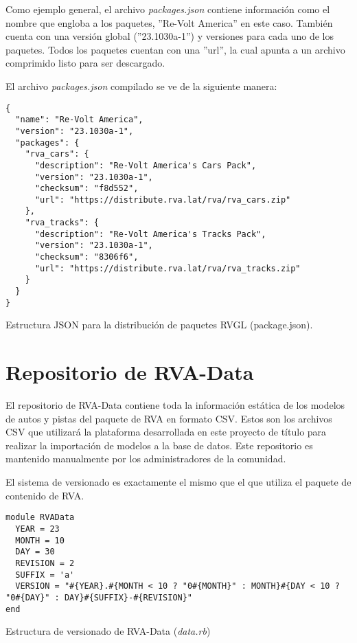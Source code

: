 Como ejemplo general, el archivo \textit{packages.json} contiene información como el nombre que engloba a los paquetes, ''Re-Volt America'' en este caso. También cuenta con una versión global (''23.1030a-1'') y versiones para cada uno de los paquetes. Todos los paquetes cuentan con una ''url'', la cual apunta a un archivo comprimido listo para ser descargado.

El archivo \textit{packages.json} compilado se ve de la siguiente manera:

\begin{longlisting}
  \begin{verbatim}  
{
  "name": "Re-Volt America",
  "version": "23.1030a-1",
  "packages": {
    "rva_cars": {
      "description": "Re-Volt America's Cars Pack",
      "version": "23.1030a-1",
      "checksum": "f8d552",
      "url": "https://distribute.rva.lat/rva/rva_cars.zip"
    },
    "rva_tracks": {
      "description": "Re-Volt America's Tracks Pack",
      "version": "23.1030a-1",
      "checksum": "8306f6",
      "url": "https://distribute.rva.lat/rva/rva_tracks.zip"
    }
  }
}
  \end{verbatim}
  \caption[Esquema de Paquetes RVGL]{Estructura JSON para la distribución de paquetes RVGL (package.json).}
\end{longlisting}

\newpage

\section{Repositorio de RVA-Data}
El repositorio de RVA-Data contiene toda la información estática de los modelos de autos y pistas del paquete de RVA en formato CSV. Estos son los archivos CSV que utilizará la plataforma desarrollada en este proyecto de título para realizar la importación de modelos a la base de datos. Este repositorio es mantenido manualmente por los administradores de la comunidad.

El sistema de versionado es exactamente el mismo que el que utiliza el paquete de contenido de RVA.

\begin{longlisting}
  \begin{verbatim}  
module RVAData
  YEAR = 23
  MONTH = 10
  DAY = 30
  REVISION = 2
  SUFFIX = 'a'
  VERSION = "#{YEAR}.#{MONTH < 10 ? "0#{MONTH}" : MONTH}#{DAY < 10 ? "0#{DAY}" : DAY}#{SUFFIX}-#{REVISION}"
end
  \end{verbatim}
  \caption[Esquema de versionado de RVA-Data]{Estructura de versionado de RVA-Data (\textit{data.rb})}
\end{longlisting}

